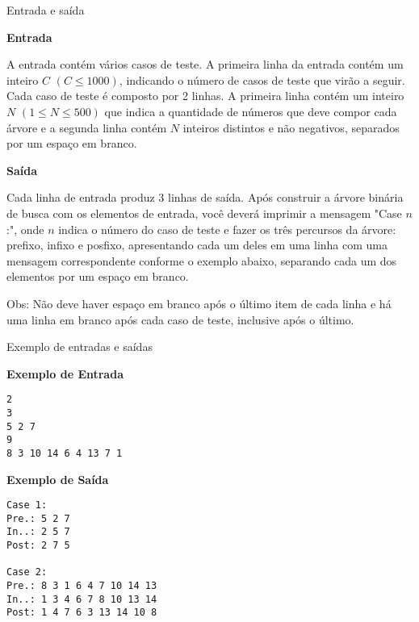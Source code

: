 \begin{frame}[fragile]{Entrada e saída}

\textbf{Entrada}

A entrada contém vários casos de teste. A primeira linha da entrada contém um inteiro $C$ $(C \leq 1000)$, indicando o número de casos de teste que virão a seguir. Cada caso de teste é composto por 2 linhas. A primeira linha contém um inteiro $N$ $(1 \leq N \leq 500)$ que indica a quantidade de números que deve compor cada árvore e a segunda linha contém $N$ inteiros distintos e não negativos, separados por um espaço em branco.

\textbf{Saída}

Cada linha de entrada produz 3 linhas de saída. Após construir a árvore binária de busca com os elementos de entrada, você deverá imprimir a mensagem "Case $n$:", onde $n$ indica o número do caso de teste e fazer os três percursos da árvore: prefixo, infixo e posfixo, apresentando cada um deles em uma linha com uma mensagem correspondente conforme o exemplo abaixo, separando cada um dos elementos por um espaço em branco. 

Obs: Não deve haver espaço em branco após o último item de cada linha e há uma linha em branco após cada caso de teste, inclusive após o último.

\end{frame}

\begin{frame}[fragile]{Exemplo de entradas e saídas}

\begin{minipage}[t]{0.5\textwidth}
\textbf{Exemplo de Entrada}
\begin{verbatim}
2
3
5 2 7
9
8 3 10 14 6 4 13 7 1
\end{verbatim}
\end{minipage}
\begin{minipage}[t]{0.45\textwidth}
\textbf{Exemplo de Saída}
\begin{verbatim}
Case 1:
Pre.: 5 2 7
In..: 2 5 7
Post: 2 7 5

Case 2:
Pre.: 8 3 1 6 4 7 10 14 13
In..: 1 3 4 6 7 8 10 13 14
Post: 1 4 7 6 3 13 14 10 8
\end{verbatim}
\end{minipage}
\end{frame}

